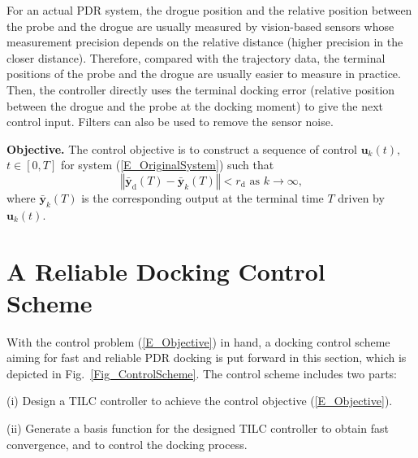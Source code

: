 For an actual PDR system, the drogue position and the relative position between the probe and the drogue are usually measured by vision-based sensors whose measurement precision depends on the relative distance (higher precision in the closer distance). Therefore, compared with the trajectory data, the terminal positions of the probe and the drogue are usually easier to measure in practice. Then, the controller directly uses the terminal docking error (relative position between the drogue and the probe at the docking moment) to give the next control input. Filters can also be used to remove the sensor noise.

\textbf{Objective.} The control objective is to construct a sequence of
control $\mathbf{u}_{k}\left(  t\right)  ,$ $t\in \left[  0,T\right]  $ for
system (\ref{E_OriginalSystem}) such that
\begin{equation}
\left \Vert \mathbf{\bar{y}}_{\text{d}}\left(  T\right)  -\mathbf{\bar{y}}%
_{k}\left(  T\right)  \right \Vert <r_{\text{d}}\text{ as }k\rightarrow
\infty \text{,} \label{E_Objective}%
\end{equation}
where $\mathbf{\bar{y}}_{k}\left(  T\right)  $ is the corresponding output at
the terminal time $T$ driven by $\mathbf{u}_{k}\left(  t\right)  $.

\section{A Reliable Docking Control Scheme}

\label{ControlScheme}

With the control problem (\ref{E_Objective}) in hand, a docking control scheme
aiming for fast and reliable PDR docking is put forward in this section, which
is depicted in Fig.~\ref{Fig_ControlScheme}. The control scheme includes two parts:

(i) Design a TILC controller to achieve the control objective
(\ref{E_Objective}).

(ii) Generate a basis function for the designed TILC controller to obtain
fast convergence, and to control the docking process.

